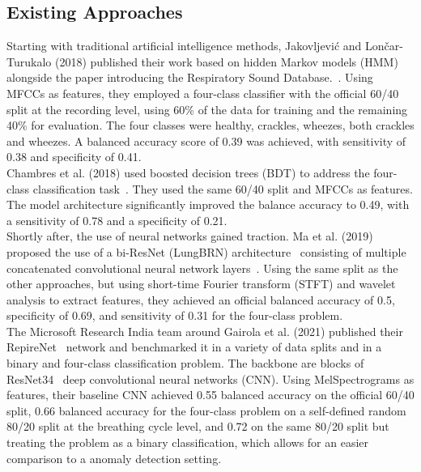 \subsection{Existing Approaches}
Starting with traditional artificial intelligence methods, Jakovljevi{\'c} and Lon{\v{c}}ar-Turukalo (2018) published their work based on hidden Markov models (HMM) alongside the paper introducing the Respiratory Sound Database.~\cite{jakovljevic2018hidden}. Using MFCCs as features, they employed a four-class classifier with the official 60/40 split at the recording level, using 60\% of the data for training and the remaining 40\% for evaluation. The four classes were healthy, crackles, wheezes, both crackles and wheezes. A balanced accuracy score of 0.39 was achieved, with sensitivity of 0.38 and specificity of 0.41.\\
Chambres et al. (2018) used boosted decision trees (BDT) to address the four-class classification task~\cite{chambres2018automatic}. They used the same 60/40 split and MFCCs as features. The model architecture significantly improved the balance accuracy to 0.49, with a sensitivity of 0.78 and a specificity of 0.21.\\
Shortly after, the use of neural networks gained traction. Ma et al. (2019) proposed the use of a bi-ResNet (LungBRN) architecture~\cite{wang2019bi} consisting of multiple concatenated convolutional neural network layers~\cite{ma2019lungbrn}. Using the same split as the other approaches, but using short-time Fourier transform (STFT) and wavelet analysis to extract features, they achieved an official balanced accuracy of 0.5, specificity of 0.69, and sensitivity of 0.31 for the four-class problem.\\
The Microsoft Research India team around Gairola et al. (2021) published their RepireNet~\cite{gairola2021respirenet} network and benchmarked it in a variety of data splits and in a binary and four-class classification problem. The backbone are blocks of ResNet34~\cite{he2016deep} deep convolutional neural networks (CNN). Using MelSpectrograms as features, their baseline CNN achieved 0.55 balanced accuracy on the official 60/40 split, 0.66 balanced accuracy for the four-class problem on a self-defined random 80/20 split at the breathing cycle level, and 0.72 on the same 80/20 split but treating the problem as a binary classification, which allows for an easier comparison to a anomaly detection setting.\\
